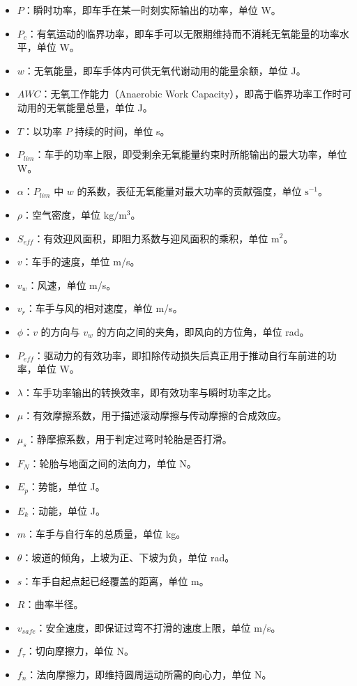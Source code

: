 \documentclass[11pt,a4paper]{ctexart}
\begin{document}
\begin{itemize}
\item $P$：瞬时功率，即车手在某一时刻实际输出的功率，单位 W。
\item $P_c$：有氧运动的临界功率，即车手可以无限期维持而不消耗无氧能量的功率水平，单位 W。
\item $w$：无氧能量，即车手体内可供无氧代谢动用的能量余额，单位 J。
\item $AWC$：无氧工作能力（Anaerobic Work Capacity），即高于临界功率工作时可动用的无氧能量总量，单位 J。
\item $T$：以功率 $P$ 持续的时间，单位 s。
\item $P_{lim}$：车手的功率上限，即受剩余无氧能量约束时所能输出的最大功率，单位 W。
\item $\alpha$：$P_{lim}$ 中 $w$ 的系数，表征无氧能量对最大功率的贡献强度，单位 $\mathrm{s}^{-1}$。
\item $\rho$：空气密度，单位 $\mathrm{kg/m^3}$。
\item $S_{eff}$：有效迎风面积，即阻力系数与迎风面积的乘积，单位 $\mathrm{m^2}$。
\item $v$：车手的速度，单位 m/s。
\item $v_w$：风速，单位 m/s。
\item $v_r$：车手与风的相对速度，单位 m/s。
\item $\phi$：$v$ 的方向与 $v_w$ 的方向之间的夹角，即风向的方位角，单位 rad。
\item $P_{eff}$：驱动力的有效功率，即扣除传动损失后真正用于推动自行车前进的功率，单位 W。
\item $\lambda$：车手功率输出的转换效率，即有效功率与瞬时功率之比。
\item $\mu$：有效摩擦系数，用于描述滚动摩擦与传动摩擦的合成效应。
\item $\mu_s$：静摩擦系数，用于判定过弯时轮胎是否打滑。
\item $F_N$：轮胎与地面之间的法向力，单位 N。
\item $E_p$：势能，单位 J。
\item $E_k$：动能，单位 J。
\item $m$：车手与自行车的总质量，单位 kg。
\item $\theta$：坡道的倾角，上坡为正、下坡为负，单位 rad。
\item $s$：车手自起点起已经覆盖的距离，单位 m。
\item $R$：曲率半径。
\item $v_{safe}$：安全速度，即保证过弯不打滑的速度上限，单位 m/s。
\item $f_{\tau}$：切向摩擦力，单位 N。
\item $f_n$：法向摩擦力，即维持圆周运动所需的向心力，单位 N。
\end{itemize}
\end{document}
